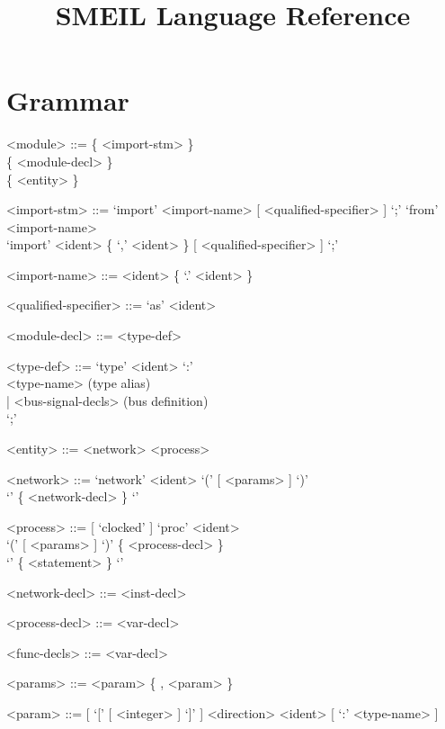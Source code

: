 \documentclass{article}
\title{SMEIL Language Reference}
\date{}
\begin{document}
\maketitle

\section*{Grammar}
\begin{grammar}
  <module> ::= \{ <import-stm> \} \\ \{ <module-decl> \} \\ \{ <entity> \}

  <import-stm> ::= `import' <import-name> [ <qualified-specifier> ] `;'
  \alt `from' <import-name> \\ `import' <ident> \{ `,' <ident> \} [ <qualified-specifier> ]
  `;'

  <import-name> ::= <ident> \{ `.' <ident> \}

  <qualified-specifier> ::= `as' <ident>

  <module-decl> ::= <type-def>

  <type-def> ::= `type' <ident> `:' \\
    <type-name> (type alias) \\
    | <bus-signal-decls> (bus definition)\\
    `;' 

  <entity> ::= <network>
  \alt <process>

  <network> ::= `network' <ident> `(' [ <params> ] `)' \\`{' \{ <network-decl> \} `}'

  <process> ::= [ `clocked' ] `proc' <ident> \\ `(' [
             <params> ] `)' \{ <process-decl> \}\\ `{' \{ <statement> \} `}'

  <network-decl> ::= <inst-decl>

  <process-decl> ::= <var-decl>

  <func-decls> ::= <var-decl>
  
  <params> ::= <param> \{ , <param> \}

  <param> ::= [ `[' [ <integer> ] `]' ] <direction> <ident> [ `:' <type-name> ]


\end{grammar}
\end{document}
